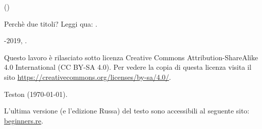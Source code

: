﻿\begin{titlepage}


\end{titlepage}

\newpage

\begin{center}
\vspace*{\fill}
{\LARGE \TitleMain}

\bigskip

{\large (\TitleAux)}

\bigskip
\bigskip
Perchè due titoli? Leggi qua: .

\vspace*{\fill}

{\large \AUTHOR}

{\large \TT{<\EMAIL>}}
\vspace*{\fill}
\vfill

\ccbysa

-2019, \AUTHOR.

Questo lavoro è rilasciato sotto licenza Creative Commons Attribution-ShareAlike 4.0 International (CC BY-SA 4.0).
Per vedere la copia di questa licenza visita il sito \url{https://creativecommons.org/licenses/by-sa/4.0/}.

Teston ({\large \today}).

L'ultima versione (e l'edizione Russa) del testo sono accessibili al seguente sito: \href{http://go.yurichev.com/17009}{beginners.re}.

\end{center}
